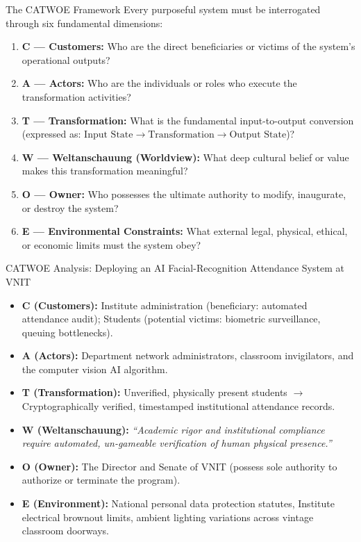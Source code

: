 \begin{definitionbox}{The CATWOE Framework}
Every purposeful system must be interrogated through six fundamental dimensions:
\begin{enumerate}[leftmargin=2em]
    \item \textbf{C --- Customers:} Who are the direct beneficiaries or victims of the system's operational outputs?
    \item \textbf{A --- Actors:} Who are the individuals or roles who execute the transformation activities?
    \item \textbf{T --- Transformation:} What is the fundamental input-to-output conversion (expressed as: $\text{Input State} \to \text{Transformation} \to \text{Output State}$)?
    \item \textbf{W --- Weltanschauung (Worldview):} What deep cultural belief or value makes this transformation meaningful?
    \item \textbf{O --- Owner:} Who possesses the ultimate authority to modify, inaugurate, or destroy the system?
    \item \textbf{E --- Environmental Constraints:} What external legal, physical, ethical, or economic limits must the system obey?
\end{enumerate}
\end{definitionbox}

\begin{examplebox}{CATWOE Analysis: Deploying an AI Facial-Recognition Attendance System at VNIT}
\begin{itemize}[leftmargin=1.5em]
    \item \textbf{C (Customers):} Institute administration (beneficiary: automated attendance audit); Students (potential victims: biometric surveillance, queuing bottlenecks).
    \item \textbf{A (Actors):} Department network administrators, classroom invigilators, and the computer vision AI algorithm.
    \item \textbf{T (Transformation):} Unverified, physically present students $\longrightarrow$ Cryptographically verified, timestamped institutional attendance records.
    \item \textbf{W (Weltanschauung):} \textit{``Academic rigor and institutional compliance require automated, un-gameable verification of human physical presence.''}
    \item \textbf{O (Owner):} The Director and Senate of VNIT (possess sole authority to authorize or terminate the program).
    \item \textbf{E (Environment):} National personal data protection statutes, Institute electrical brownout limits, ambient lighting variations across vintage classroom doorways.
\end{itemize}
\end{examplebox}

